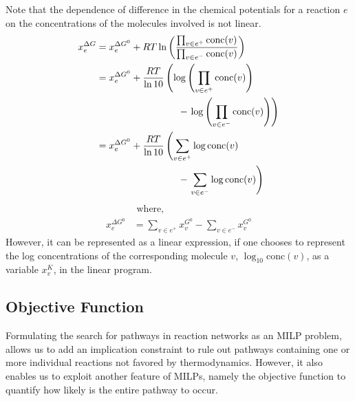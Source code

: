 Note that the dependence of difference in the chemical potentials for a reaction $e$ on the concentrations of the molecules involved is not linear.
\begin{align*}
    x^{\Delta G}_e &= x^{\Delta G^0}_e + RT \ln\left(\frac{\prod_{v\in e^+} \text{conc}(v)}{\prod_{v\in e^-} \text{conc}(v)}\right) \\
    &= x^{\Delta G^0}_e + \frac{RT}{\ln 10}\left(\log\left(\prod_{v\in e^+} \text{conc}(v)\right)\right.\\
    & \text{\hspace{3cm}}- \left.\log\left(\prod_{v\in e^-} \text{conc}(v)\right)\right) \\
    &= x^{\Delta G^0}_e + \frac{RT}{\ln 10}\left(\sum_{v\in e^+} \log \text{conc}(v)\right.\\
    & \text{\hspace{3cm}}- \left.\sum_{v\in e^-} \log \text{conc}(v)\right)
\end{align*}
\begin{align*}
    & \text{ where, }\\
    x^{\Delta G^0}_e &= \sum_{v\in e^+} x^{G^0}_v - \sum_{v\in e^-} x^{G^0}_v
\end{align*}
However, it can be represented as a linear expression, if one chooses to represent the log concentrations of the corresponding molecule $v$, $\log_{10} \text{conc}(v)$, as a variable $x_v^K$, in the linear program. 


\subsection{Objective Function}

Formulating the search for pathways in reaction networks as an MILP problem,
allows us to add an implication constraint to rule out pathways containing one or more individual reactions not favored by thermodynamics.
However, it also enables us to exploit another feature of MILPs,
namely the objective function to quantify how likely is the entire pathway to occur.

